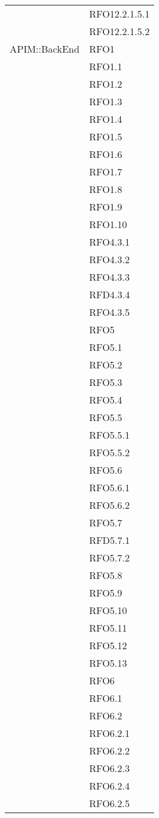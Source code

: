 \begin{longtable}{ p{12cm} | p{4cm} }
			& RFO12.2.1.5.1 \\
			& RFO12.2.1.5.2 \\
			\hline
			APIM::BackEnd
			& RFO1 \\
			& RFO1.1 \\
			& RFO1.2 \\
			& RFO1.3 \\
			& RFO1.4 \\
			& RFO1.5 \\
			& RFO1.6 \\
			& RFO1.7 \\
			& RFO1.8 \\
			& RFO1.9 \\
			& RFO1.10 \\
			& RFO4.3.1 \\
			& RFO4.3.2 \\
			& RFO4.3.3 \\
			& RFD4.3.4 \\
			& RFO4.3.5 \\
			& RFO5 \\
			& RFO5.1 \\
			& RFO5.2 \\
			& RFO5.3 \\
			& RFO5.4 \\
			& RFO5.5 \\
			& RFO5.5.1 \\
			& RFO5.5.2 \\
			& RFO5.6 \\
			& RFO5.6.1 \\
			& RFO5.6.2 \\
			& RFO5.7 \\
			& RFD5.7.1 \\
			& RFO5.7.2 \\
			& RFO5.8 \\
			& RFO5.9 \\
			& RFO5.10 \\
			& RFO5.11 \\
			& RFO5.12 \\
			& RFO5.13 \\
			& RFO6 \\
			& RFO6.1 \\
			& RFO6.2 \\
			& RFO6.2.1 \\
			& RFO6.2.2 \\
			& RFO6.2.3 \\
			& RFO6.2.4 \\
			& RFO6.2.5 \\

\end{longtable}
